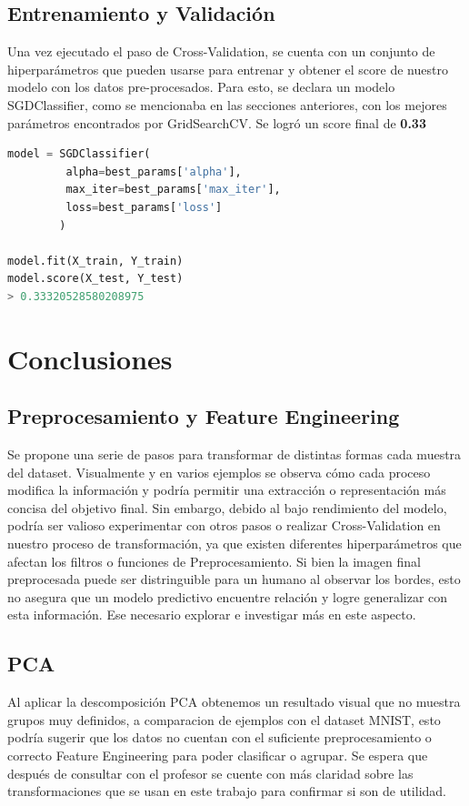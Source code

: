 \documentclass[journal]{IEEEtran}
\begin{document}
\subsection{Entrenamiento y Validación}
Una vez ejecutado el paso de Cross-Validation, se cuenta con un conjunto de hiperparámetros que pueden usarse para entrenar y obtener el score de nuestro modelo con los datos pre-procesados. Para esto, se declara un modelo SGDClassifier, como se mencionaba en las secciones anteriores, con los mejores parámetros encontrados por GridSearchCV. Se logró un score final de \textbf{0.33}

\begin{lstlisting}[language=Python]
model = SGDClassifier(
         alpha=best_params['alpha'],
         max_iter=best_params['max_iter'],
         loss=best_params['loss']
        )

model.fit(X_train, Y_train)
model.score(X_test, Y_test)
> 0.33320528580208975
\end{lstlisting}

\section{Conclusiones}

\subsection{Preprocesamiento y Feature Engineering}
Se propone una serie de pasos para transformar de distintas formas cada muestra del dataset. Visualmente y en varios ejemplos se observa cómo cada proceso modifica la información y podría permitir una extracción o representación más concisa del objetivo final. Sin embargo, debido al bajo rendimiento del modelo, podría ser valioso experimentar con otros pasos o realizar Cross-Validation en nuestro proceso de transformación, ya que existen diferentes hiperparámetros que afectan los filtros o funciones de Preprocesamiento. Si bien la imagen final preprocesada puede ser distringuible para un humano al observar los bordes, esto no asegura que un modelo predictivo encuentre relación y logre generalizar con esta información. Ese necesario explorar e investigar más en este aspecto.

\subsection{PCA}
Al aplicar la descomposición PCA obtenemos un resultado visual que no muestra grupos muy definidos, a comparacion de ejemplos con el dataset MNIST, esto podría sugerir que los datos no cuentan con el suficiente preprocesamiento o correcto Feature Engineering para poder clasificar o agrupar. Se espera que después de consultar con el profesor se cuente con más claridad sobre las transformaciones que se usan en este trabajo para confirmar si son de utilidad.
\end{document}
